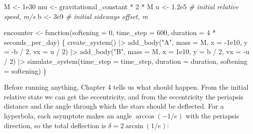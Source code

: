 \documentclass[
  10.5pt,
  letterpaper,
]{scrbook}
\newenvironment{Shaded}{\begin{snugshade}}{\end{snugshade}}
\newcommand{\AttributeTok}[1]{\textcolor[rgb]{0.00,0.00,0.00}{#1}}
\newcommand{\CommentTok}[1]{\textcolor[rgb]{0.00,0.00,0.00}{\textit{#1}}}
\newcommand{\ControlFlowTok}[1]{\textcolor[rgb]{0.00,0.00,0.00}{#1}}
\newcommand{\DecValTok}[1]{\textcolor[rgb]{0.00,0.00,0.00}{#1}}
\newcommand{\FloatTok}[1]{\textcolor[rgb]{0.00,0.00,0.00}{#1}}
\newcommand{\FunctionTok}[1]{\textcolor[rgb]{0.00,0.00,0.00}{#1}}
\newcommand{\NormalTok}[1]{\textcolor[rgb]{0.00,0.00,0.00}{#1}}
\newcommand{\OtherTok}[1]{\textcolor[rgb]{0.00,0.00,0.00}{#1}}
\newcommand{\SpecialCharTok}[1]{\textcolor[rgb]{0.00,0.00,0.00}{#1}}
\newcommand{\StringTok}[1]{\textcolor[rgb]{0.00,0.00,0.00}{#1}}
\theoremstyle{definition}
\theoremstyle{plain}
\theoremstyle{remark}
\begin{document}
\begin{Shaded}
\begin{Highlighting}[]
\NormalTok{M  }\OtherTok{\textless{}{-}} \FloatTok{1e30}
\NormalTok{mu }\OtherTok{\textless{}{-}}\NormalTok{ gravitational\_constant }\SpecialCharTok{*} \DecValTok{2} \SpecialCharTok{*}\NormalTok{ M}
\NormalTok{u  }\OtherTok{\textless{}{-}} \FloatTok{1.2e5}     \CommentTok{\# initial relative speed, m/s}
\NormalTok{b  }\OtherTok{\textless{}{-}} \FloatTok{3e9}       \CommentTok{\# initial sideways offset, m}

\NormalTok{encounter }\OtherTok{\textless{}{-}} \ControlFlowTok{function}\NormalTok{(}\AttributeTok{softening =} \DecValTok{0}\NormalTok{, }\AttributeTok{time\_step =} \DecValTok{600}\NormalTok{,}
                      \AttributeTok{duration =} \DecValTok{4} \SpecialCharTok{*}\NormalTok{ seconds\_per\_day) \{}
  \FunctionTok{create\_system}\NormalTok{() }\SpecialCharTok{|\textgreater{}}
    \FunctionTok{add\_body}\NormalTok{(}\StringTok{"A"}\NormalTok{, }\AttributeTok{mass =}\NormalTok{ M, }\AttributeTok{x =} \SpecialCharTok{{-}}\FloatTok{1e10}\NormalTok{, }\AttributeTok{y =} \SpecialCharTok{{-}}\NormalTok{b }\SpecialCharTok{/} \DecValTok{2}\NormalTok{, }\AttributeTok{vx =}\NormalTok{  u }\SpecialCharTok{/} \DecValTok{2}\NormalTok{) }\SpecialCharTok{|\textgreater{}}
    \FunctionTok{add\_body}\NormalTok{(}\StringTok{"B"}\NormalTok{, }\AttributeTok{mass =}\NormalTok{ M, }\AttributeTok{x =}  \FloatTok{1e10}\NormalTok{, }\AttributeTok{y =}\NormalTok{  b }\SpecialCharTok{/} \DecValTok{2}\NormalTok{, }\AttributeTok{vx =} \SpecialCharTok{{-}}\NormalTok{u }\SpecialCharTok{/} \DecValTok{2}\NormalTok{) }\SpecialCharTok{|\textgreater{}}
    \FunctionTok{simulate\_system}\NormalTok{(}\AttributeTok{time\_step =}\NormalTok{ time\_step, }\AttributeTok{duration =}\NormalTok{ duration,}
                    \AttributeTok{softening =}\NormalTok{ softening)}
\NormalTok{\}}
\end{Highlighting}
\end{Shaded}

Before running anything, Chapter 4 tells us what should happen. From the
initial relative state we can get the eccentricity, and from the
eccentricity the periapsis distance and the angle through which the
stars should be deflected. For a hyperbola, each asymptote makes an
angle \(\arccos(-1/e)\) with the periapsis direction, so the total
deflection is \(\delta = 2\arcsin(1/e)\):
\end{document}

